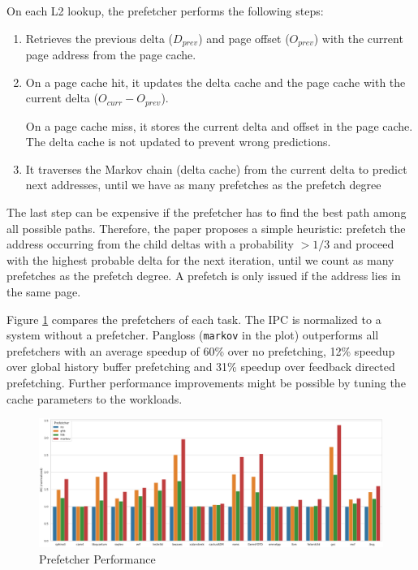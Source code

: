 \documentclass[a4paper]{article}
\begin{document}
On each L2 lookup, the prefetcher performs the following steps:
\begin{enumerate}
    \item Retrieves the previous delta ($D_{prev}$) and page offset ($O_{prev}$)
        with the current page address from the page cache.

    \item On a page cache hit, it updates the delta cache and the page cache
        with the current delta ($O_{curr} - O_{prev}$).

        On a page cache miss, it stores the current delta and offset in the page
        cache. The delta cache is not updated to prevent wrong predictions.

    \item It traverses the Markov chain (delta cache) from the current delta to
        predict next addresses, until we have as many prefetches as the prefetch
        degree
\end{enumerate}

The last step can be expensive if the prefetcher has to find the best path among
all possible paths. Therefore, the paper proposes a simple heuristic: prefetch
the address occurring from the child deltas with a probability $>1/3$ and
proceed with the highest probable delta for the next iteration, until we count
as many prefetches as the prefetch degree. A prefetch is only issued if the
address lies in the same page.

Figure \ref{fig:performance} compares the prefetchers of each task. The IPC is
normalized to a system without a prefetcher. Pangloss (\texttt{markov} in the
plot) outperforms all prefetchers with an average speedup of 60\% over no
prefetching, 12\% speedup over global history buffer prefetching and 31\%
speedup over feedback directed prefetching. Further performance improvements
might be possible by tuning the cache parameters to the workloads.

\begin{landscape}
\begin{figure}
    \centering
    \includegraphics[width=\paperwidth]{plot}
    \caption{Prefetcher Performance}
    \label{fig:performance}
\end{figure}
\end{landscape}

\newpage

\printbibliography
\end{document}
